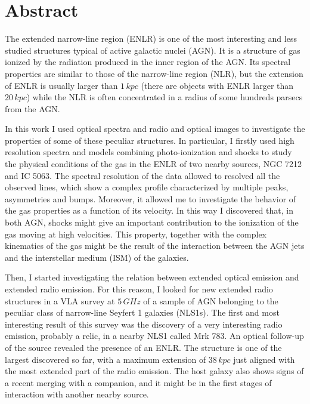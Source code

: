 \documentclass[../main.tex]{subfiles}
\begin{document}
\chapter{Abstract}
\label{sec:abstract}

The extended narrow-line region (ENLR) is one of the most interesting and less studied structures typical of active galactic nuclei (AGN).
It is a structure of gas ionized by the radiation produced in the inner region of the AGN.
Its spectral properties are similar to those of the narrow-line region (NLR), but the extension of ENLR is usually larger than $1\,\si{kpc}$ (there are objects with ENLR larger than $20\,\si{kpc}$) while the NLR is often concentrated in a radius of some hundreds parsecs from the AGN.  

In this work I used optical spectra and radio and optical images to investigate the properties of some of these peculiar structures.
In particular, I firstly used high resolution spectra and models combining photo-ionization and shocks to study the physical conditions of the gas in the ENLR of two nearby sources, NGC 7212 and IC 5063.
The spectral resolution of the data allowed to resolved all the observed lines, which show a complex profile characterized by multiple peaks, asymmetries and bumps.
Moreover, it allowed me to investigate the behavior of the gas properties as a function of its velocity.
In this way I discovered that, in both AGN, shocks might give an important contribution to the ionization of the gas moving at high velocities. 
This property, together with the complex kinematics of the gas might be the result of the interaction between the AGN jets and the interstellar medium (ISM) of the galaxies.

Then, I started investigating the relation between extended optical emission and extended radio emission.
For this reason, I looked for new extended radio structures in a VLA survey at $5\,\si{GHz}$ of a sample of AGN belonging to the peculiar class of narrow-line Seyfert 1 galaxies (NLS1s). 
The first and most interesting result of this survey was the discovery of a very interesting radio emission, probably a relic, in a nearby NLS1 called Mrk 783.
An optical follow-up of the source revealed the presence of an ENLR.
The structure is one of the largest discovered so far, with a maximum extension of $38\,\si{kpc}$ just aligned with the most extended part of the radio emission.
The host galaxy also shows signs of a recent merging with a companion, and it might be in the first stages of interaction with another nearby source.
\end{document}
